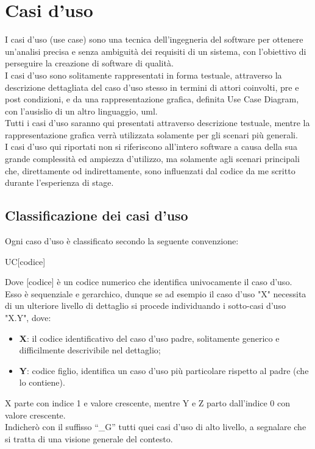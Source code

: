 \section{Casi d'uso}
I casi d'uso (use case) sono una tecnica dell'ingegneria del software per ottenere un'analisi precisa e senza ambiguità dei requisiti di un sistema, con l'obiettivo di perseguire la creazione di software di qualità.\\
I casi d'uso sono solitamente rappresentati in forma testuale, attraverso la descrizione dettagliata del caso d'uso stesso in termini di attori coinvolti, pre e post condizioni, e da una rappresentazione grafica, definita Use Case Diagram, con l'ausislio di un altro linguaggio, \gls{uml}\glsfirstoccur.\\
Tutti i casi d'uso saranno qui presentati attraverso descrizione testuale, mentre la rappresentazione grafica verrà utilizzata solamente per gli scenari più generali.\\
I casi d'uso qui riportati non si riferiscono all'intero software a causa della sua grande complessità ed ampiezza d'utilizzo, ma solamente agli scenari principali che, direttamente od indirettamente, sono influenzati dal codice da me scritto durante l'esperienza di stage.\\

\newpage

\subsection{Classificazione dei casi d'uso}
Ogni caso d’uso è classificato secondo la seguente convenzione:
\begin{center}
	UC[codice]
\end{center}
Dove [codice] è un codice numerico che identifica univocamente il caso d’uso.\\
Esso è sequenziale e gerarchico, dunque se ad esempio il caso d’uso "X" necessita di un ulteriore livello di dettaglio si procede individuando i sotto-casi d’uso "X.Y", dove:\\
\begin{itemize}
	\item \textbf{X}: il codice identificativo del caso d'uso padre, solitamente generico e difficilmente descrivibile nel dettaglio; 
	\item \textbf{Y}: codice figlio, identifica un caso d'uso più particolare rispetto al padre (che lo contiene).
	
\end{itemize}
X parte con indice 1 e valore crescente, mentre Y e Z parto dall'indice 0 con valore crescente.\\
Indicherò con il suffisso “\_G” tutti quei casi d’uso di alto livello, a segnalare che si tratta di una visione generale del contesto.
